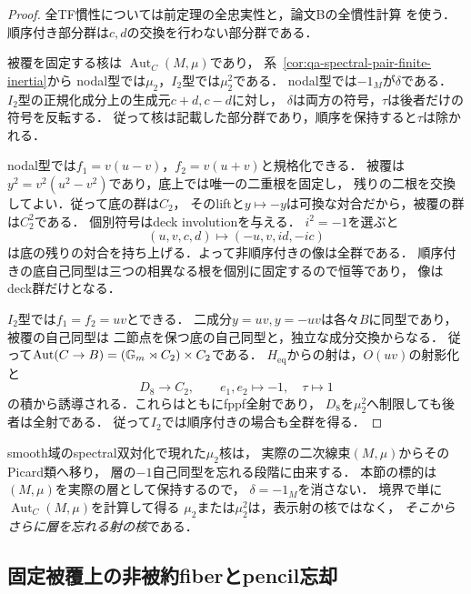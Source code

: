 \begin{proof}
全TF慣性については前定理の全忠実性と，論文Bの全慣性計算
\cite[\texttt{prop:noncubic-all-stabilizers}]{QuadricModuli2026}を使う．
順序付き部分群は$c,d$の交換を行わない部分群である．

被覆を固定する核は
$\operatorname{Aut}_C(M,\mu)$であり，
系~\ref{cor:qa-spectral-pair-finite-inertia}から
nodal型では$\mu_2$，$I_2$型では$\mu_2^2$である．
nodal型では$-1_M$が$\delta$である．
$I_2$型の正規化成分上の生成元$c+d,c-d$に対し，
$\delta$は両方の符号，$\tau$は後者だけの符号を反転する．
従って核は記載した部分群であり，順序を保持すると$\tau$は除かれる．

nodal型では$f_1=v(u-v)$，$f_2=v(u+v)$と規格化できる．
被覆は$y^2=v^2(u^2-v^2)$であり，底上では唯一の二重根を固定し，
残りの二根を交換してよい．従って底の群は$C_2$，
そのliftと$y\mapsto-y$は可換な対合だから，被覆の群は$C_2^2$である．
個別符号はdeck involutionを与える．
$i^2=-1$を選ぶと
\[
 (u,v,c,d)\longmapsto(-u,v,id,-ic)
\]
は底の残りの対合を持ち上げる．よって非順序付きの像は全群である．
順序付きの底自己同型は三つの相異なる根を個別に固定するので恒等であり，
像はdeck群だけとなる．

$I_2$型では$f_1=f_2=uv$とできる．
二成分$y=uv,y=-uv$は各々$B$に同型であり，被覆の自己同型は
二節点を保つ底の自己同型と，独立な成分交換からなる．
従って$\operatorname{Aut}(C\to B)=(\mathbb G_m\rtimes C_2)\times C_2$である．
$H_{\mathrm{eq}}$からの射は，$O(uv)$の射影化と
\[
 D_8\longrightarrow C_2,\qquad e_1,e_2\longmapsto-1,
       \quad\tau\longmapsto1
\]
の積から誘導される．これらはともにfppf全射であり，
$D_8$を$\mu_2^2$へ制限しても後者は全射である．
従って$I_2$では順序付きの場合も全群を得る．
\end{proof}

\begin{remark}[smooth二次線束gerbeとの相違]
smooth域のspectral双対化で現れた$\mu_2$核は，
実際の二次線束$(M,\mu)$からそのPicard類へ移り，
層の$-1$自己同型を忘れる段階に由来する．
本節の標的は$(M,\mu)$を実際の層として保持するので，
$\delta=-1_M$を消さない．
境界で単に$\operatorname{Aut}_C(M,\mu)$を計算して得る
$\mu_2$または$\mu_2^2$は，表示射の核ではなく，
\emph{そこからさらに層を忘れる射の核}である．
\end{remark}

\subsection{固定被覆上の非被約fiberとpencil忘却}
\label{subsec:qa-tf-fixed-cover-fibers}

